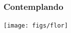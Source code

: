 \begin{frame}[fragile]
  \frametitle{Contemplando}

  \begin{center}
  \texttt{[image: figs/flor]}
  \end{center} 
  
\end{frame}
